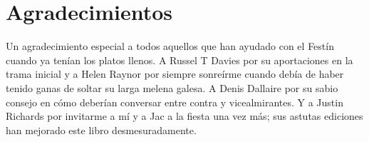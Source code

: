 \chapter*{Agradecimientos}

{Un agradecimiento especial a todos aquellos que han ayudado con el
 Festín cuando ya tenían los platos llenos. A Russel T Davies por su
 aportaciones en la trama inicial y a Helen Raynor por siempre sonreírme
 cuando debía de haber tenido ganas de soltar su larga melena galesa. A
 Denis Dallaire por su sabio consejo en cómo deberían conversar entre
 contra y vicealmirantes. Y a Justin Richards por invitarme a mí y a Jac
 a la fiesta una vez más; sus astutas ediciones han mejorado este libro
desmesuradamente.}
